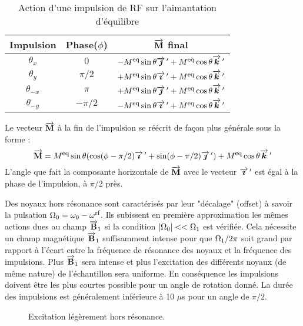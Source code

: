\begin{table}
\caption{Action d'une impulsion de RF sur l'aimantation d'équilibre}
\label{tab:phase}
\begin{center}
\begin{tabular}[hbt]{ccc}
\hline
Impulsion & Phase($\phi$) & $\overrightarrow{\mathbf{M}}$ final \\ \hline
$\theta_{x}$  & $0$      & $-M^{\mbox{\footnotesize{eq}}}\sin\theta\overrightarrow{\boldsymbol{\jmath}} \, ' + M^{\mbox{\footnotesize{eq}}}\cos\theta\overrightarrow{\boldsymbol{k}} \, '$ \\
$\theta_{y}$  & $\pi/2$  & $+M^{\mbox{\footnotesize{eq}}}\sin\theta\overrightarrow{\boldsymbol{\imath}} \, ' + M^{\mbox{\footnotesize{eq}}}\cos\theta\overrightarrow{\boldsymbol{k}} \, '$ \\
$\theta_{-x}$ & $\pi$    & $+M^{\mbox{\footnotesize{eq}}}\sin\theta\overrightarrow{\boldsymbol{\jmath}} \, ' + M^{\mbox{\footnotesize{eq}}}\cos\theta\overrightarrow{\boldsymbol{k}} \, '$ \\
$\theta_{-y}$ & $-\pi/2$ & $-M^{\mbox{\footnotesize{eq}}}\sin\theta\overrightarrow{\boldsymbol{\imath}} \, ' + M^{\mbox{\footnotesize{eq}}}\cos\theta\overrightarrow{\boldsymbol{k}} \, '$ \\
\hline
\end{tabular}
\end{center}
\end{table}
Le vecteur $\overrightarrow{\mathbf{M}}$ à la fin de l'impulsion se réécrit de façon plus générale sous la forme :
\begin{equation}
\label{eqn:pulseaction}
\overrightarrow{\mathbf{M}} = M^{\mbox{\footnotesize{eq}}} \sin\theta (\cos(\phi-\pi/2)\overrightarrow{\boldsymbol{\imath}} \, ' +
\sin(\phi-\pi/2)\overrightarrow{\boldsymbol{\jmath}} \, ') + M^{\mbox{\footnotesize{eq}}}\cos\theta\overrightarrow{\boldsymbol{k}} \, '
\end{equation}
L'angle que fait la composante horizontale de $\overrightarrow{\mathbf{M}}$ avec le vecteur $\overrightarrow{\boldsymbol{\imath}} \, '$
est égal à la phase de l'impulsion, à $\pi/2$ près.

Des noyaux hors résonance sont caractérisés par leur "décalage" (offset)
à savoir la pulsation $\Omega_0 = \omega_0 - \omega^{\mbox{\footnotesize{rf}}}$.
Ils subissent en première approximation les mêmes actions dues au
champ $\overrightarrow{\mathbf{B}}_1$ si la condition $|\Omega_0| << \Omega_1$ est vérifiée.
Cela nécessite un champ magnétique $\overrightarrow{\mathbf{B}}_1$ suffisamment intense pour
que $\Omega_1/2\pi$ soit grand par rapport à l'écart
entre la fréquence de résonance des noyaux et la fréquence des impulsions.
Plus $\overrightarrow{\mathbf{B}}_1$ sera intense et plus l'excitation des différents noyaux (de même nature)
de l'échantillon sera uniforme.
En conséquence les impulsions doivent être les plus courtes possible pour un
angle de rotation donné.
La durée des impulsions est généralement inférieure à 10 $\mu$s
pour un angle de $\pi/2$.

\begin{figure}[hbt]
\begin{center}
\end{center}
\caption{Excitation légèrement hors résonance.}
\label{fig:offres}
\end{figure}

